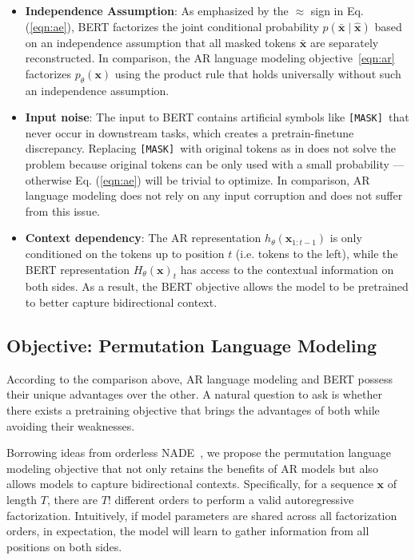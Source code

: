 \documentclass{article}
\newcommand{\mask}{\texttt{\small [MASK]}}\newcommand{\cls}{\texttt{\small [CLS]}}\newcommand{\sep}{\texttt{\small [SEP]}}\newcommand{\unk}{\texttt{unk}}
\def\rvx{{\mathbf{x}}}
\begin{document}
\begin{itemize}[leftmargin=*,topsep=0em,itemsep=0em]
\item \textbf{Independence Assumption}: 
As emphasized by the $\approx$ sign in Eq. (\ref{eqn:ae}), BERT factorizes the joint conditional probability $p(\bar{\rvx} \mid \hat{\rvx})$ based on an independence assumption that all masked tokens $\bar{\rvx}$ are separately reconstructed.
In comparison, the AR language modeling objective~\eqref{eqn:ar} factorizes $p_\theta(\rvx)$ using the product rule that holds universally without such an independence assumption.
\item \textbf{Input noise}:
The input to BERT contains artificial symbols like \mask~that never occur in downstream tasks, which creates a pretrain-finetune discrepancy.
Replacing \mask~with original tokens as in \cite{devlin2018bert} does not solve the problem
because original tokens can be only used with a small probability --- otherwise Eq. (\ref{eqn:ae}) will be trivial to optimize.
In comparison, AR language modeling does not rely on any input corruption and does not suffer from this issue.
\item \textbf{Context dependency}: The AR representation $h_\theta(\rvx_{1:t-1})$ is only conditioned on the tokens up to position $t$ (i.e. tokens to the left), while the BERT representation $H_\theta(\rvx)_t$ has access to the contextual information on both sides.
As a result, the BERT objective allows the model to be pretrained to better capture bidirectional context. 


\end{itemize}





\subsection{Objective: Permutation Language Modeling}
\label{sec:objective}

According to the comparison above, AR language modeling and BERT possess their unique advantages over the other.
A natural question to ask is whether there exists a pretraining objective that brings the advantages of both while avoiding their weaknesses.

Borrowing ideas from orderless NADE~\cite{uria2016neural}, we propose the permutation language modeling objective that not only retains the benefits of AR models but also allows models to capture bidirectional contexts.
Specifically, for a sequence $\rvx$ of length $T$, there are $T!$ different orders to perform a valid autoregressive factorization.
Intuitively, if model parameters are shared across all factorization orders, in expectation, the model will learn to gather information from all positions on both sides.
\end{document}
